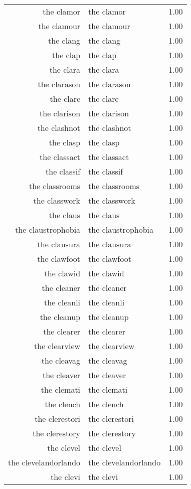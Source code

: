 \begin{table}[ht]
\begin{tabular}{rlr}
  the clamor & the clamor & 1.00 \\ 
  the clamour & the clamour & 1.00 \\ 
  the clang & the clang & 1.00 \\ 
  the clap & the clap & 1.00 \\ 
  the clara & the clara & 1.00 \\ 
  the clarason & the clarason & 1.00 \\ 
  the clare & the clare & 1.00 \\ 
  the clarison & the clarison & 1.00 \\ 
  the clashnot & the clashnot & 1.00 \\ 
  the clasp & the clasp & 1.00 \\ 
  the classact & the classact & 1.00 \\ 
  the classif & the classif & 1.00 \\ 
  the classrooms & the classrooms & 1.00 \\ 
  the classwork & the classwork & 1.00 \\ 
  the claus & the claus & 1.00 \\ 
  the claustrophobia & the claustrophobia & 1.00 \\ 
  the clausura & the clausura & 1.00 \\ 
  the clawfoot & the clawfoot & 1.00 \\ 
  the clawid & the clawid & 1.00 \\ 
  the cleaner & the cleaner & 1.00 \\ 
  the cleanli & the cleanli & 1.00 \\ 
  the cleanup & the cleanup & 1.00 \\ 
  the clearer & the clearer & 1.00 \\ 
  the clearview & the clearview & 1.00 \\ 
  the cleavag & the cleavag & 1.00 \\ 
  the cleaver & the cleaver & 1.00 \\ 
  the clemati & the clemati & 1.00 \\ 
  the clench & the clench & 1.00 \\ 
  the clerestori & the clerestori & 1.00 \\ 
  the clerestory & the clerestory & 1.00 \\ 
  the clevel & the clevel & 1.00 \\ 
  the clevelandorlando & the clevelandorlando & 1.00 \\ 
  the clevi & the clevi & 1.00 \\ 

\end{tabular}
\end{table}
